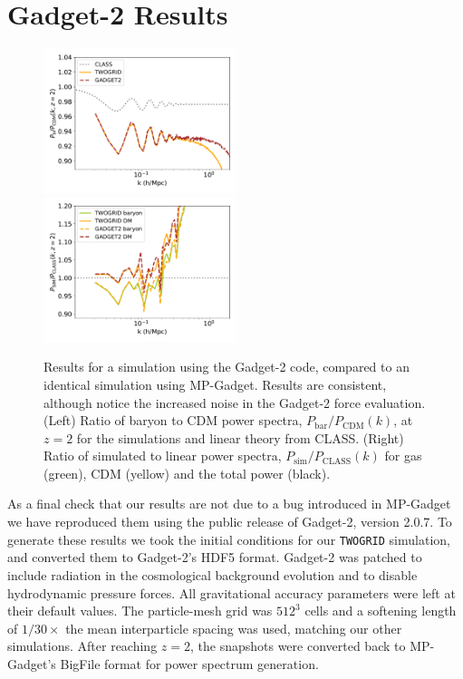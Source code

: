 \documentclass[a4paper,11pt]{article}
\begin{document}
\appendix

\section{Gadget-2 Results}
\label{ap:gadget2}

\begin{figure}
\includegraphics[width=0.5\textwidth]{plots/gadget2_2_relpower.pdf}
\includegraphics[width=0.5\textwidth]{plots/gadget2_2_class.pdf}
\caption{Results for a simulation using the Gadget-2 code, compared to an identical simulation using MP-Gadget. Results are consistent, although notice the increased noise in the Gadget-2 force evaluation. (Left) Ratio of baryon to CDM power spectra, $P_\mathrm{bar}/P_\mathrm{CDM}(k)$, at $z=2$ for the simulations and linear theory from CLASS. (Right) Ratio of simulated to linear power spectra, $P_\mathrm{sim}/P_\mathrm{CLASS}(k)$ for gas (green), CDM (yellow) and the total power (black).}
  \label{fig:gadget2}
\end{figure}

As a final check that our results are not due to a bug introduced in MP-Gadget we have reproduced them using the public release of Gadget-2, version 2.0.7. To generate these results we took the initial conditions for our \texttt{TWOGRID} simulation, and converted them to Gadget-2's HDF5 format. Gadget-2 was patched to include radiation in the cosmological background evolution and to disable hydrodynamic pressure forces. All gravitational accuracy parameters were left at their default values. The particle-mesh grid was $512^3$ cells and a softening length of $1/30 \times$ the mean interparticle spacing was used, matching our other simulations. After reaching $z=2$, the snapshots were converted back to MP-Gadget's BigFile format for power spectrum generation.
\end{document}
